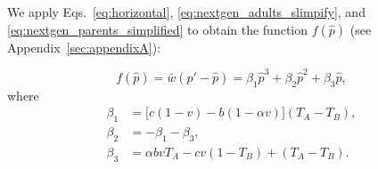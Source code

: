 \documentclass[12pt]{extarticle}
\begin{document}
{%
%

We apply Eqs.\ \ref{eq:horizontal}, \ref{eq:nextgen_adults_slimpify}, and \ref{eq:nextgen_parents_simplified} to obtain the function $f(\hat{p})$ (see Appendix~\autoref{sec:appendixA}):

\begin{equation} \label{eq:general_case_polynomial}
  f(\hat{p}) = \bar{w}(\hat{p}'-\hat{p}) =
  \beta_1 \hat{p}^3 + \beta_2 \hat{p}^2 + \beta_3 \hat{p},
\end{equation}
where 
\begin{equation} \label{eq:polynomial_coefficients}
\begin{aligned}
\beta_1 &= \big[c(1-v) - b (1-\alpha v)\big] (T_A-T_B) , \\
\beta_2 &= -\beta_1 -\beta_3 ,  \\
\beta_3 &= \alpha bvT_A - cv(1-T_B) + (T_A-T_B) .
\end{aligned}
\end{equation}

}
\end{document}
